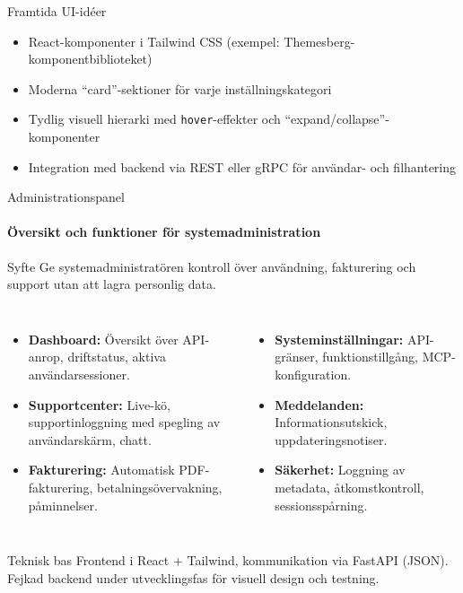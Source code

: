 \documentclass[10pt]{beamer}
\begin{document}
\begin{frame}[fragile]
  \vspace{0.4cm}

  \begin{block}{Framtida UI-idéer}
    \begin{itemize}
      \item React-komponenter i Tailwind CSS (exempel: Themesberg-komponentbiblioteket)
      \item Moderna “card”-sektioner för varje inställningskategori
      \item Tydlig visuell hierarki med \texttt{hover}-effekter och “expand/collapse”-komponenter
      \item Integration med backend via REST eller gRPC för användar- och filhantering
    \end{itemize}
  \end{block}
\end{frame}

\begin{frame}{Administrationspanel}
\framesubtitle{Översikt och funktioner för systemadministration}

\begin{block}{Syfte}
Ge systemadministratören kontroll över användning, fakturering och support utan att lagra personlig data.
\end{block}

\begin{columns}[T]
\begin{itemize}
  \item \textbf{Dashboard:} Översikt över API-anrop, driftstatus, aktiva användarsessioner.
  \item \textbf{Supportcenter:} Live-kö, supportinloggning med spegling av användarskärm, chatt.
  \item \textbf{Fakturering:} Automatisk PDF-fakturering, betalningsövervakning, påminnelser.
\end{itemize}

\begin{itemize}
  \item \textbf{Systeminställningar:} API-gränser, funktionstillgång, MCP-konfiguration.
  \item \textbf{Meddelanden:} Informationsutskick, uppdateringsnotiser.
  \item \textbf{Säkerhet:} Loggning av metadata, åtkomstkontroll, sessionsspårning.
\end{itemize}
\end{columns}

\begin{block}{Teknisk bas}
Frontend i React + Tailwind, kommunikation via FastAPI (JSON).  
Fejkad backend under utvecklingsfas för visuell design och testning.
\end{block}

\end{frame}
\end{document}
